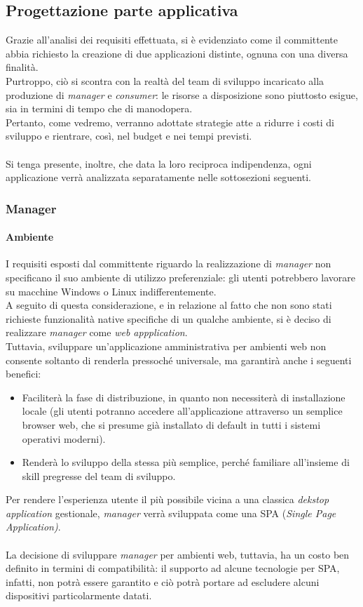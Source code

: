 \documentclass[12pt]{article}
\begin{document}
\subsection{Progettazione parte applicativa}
Grazie all'analisi dei requisiti effettuata, si è evidenziato come il committente abbia richiesto la creazione di due applicazioni distinte, ognuna con una diversa finalità.\\
Purtroppo, ciò si scontra con la realtà del team di sviluppo incaricato alla produzione di \textit{manager} e \textit{consumer}: le risorse a disposizione sono piuttosto esigue, sia in termini di tempo che di manodopera.\\
Pertanto, come vedremo, verranno adottate strategie atte a ridurre i costi di sviluppo e rientrare, così, nel budget e nei tempi previsti.\\\\
Si tenga presente, inoltre, che data la loro reciproca indipendenza, ogni applicazione verrà analizzata separatamente nelle sottosezioni seguenti.
\subsubsection{Manager}
\paragraph{Ambiente}
I requisiti esposti dal committente riguardo la realizzazione di \textit{manager} non specificano il suo ambiente di utilizzo preferenziale: gli utenti potrebbero lavorare su macchine Windows o Linux indifferentemente.\\
A seguito di questa considerazione, e in relazione al fatto che non sono stati richieste funzionalità native specifiche di un qualche ambiente, si è deciso di realizzare \textit{manager} come \textit{web appplication}.\\
Tuttavia, sviluppare un'applicazione amministrativa per ambienti web  non consente soltanto di renderla pressoché universale, ma garantirà anche i seguenti benefici:
\begin{itemize}
\item Faciliterà la fase di distribuzione, in quanto non necessiterà di installazione locale (gli utenti potranno accedere all'applicazione attraverso un semplice browser web, che si presume già installato di default in tutti i sistemi operativi moderni).
 \item Renderà lo sviluppo della stessa più semplice, perché familiare all'insieme di skill pregresse del team di sviluppo.
\end{itemize}
Per rendere l'esperienza utente il più possibile vicina a una classica \textit{dekstop application} gestionale, \textit{manager} verrà sviluppata come una SPA (\textit{Single Page Application)}.\\\\
La decisione di sviluppare \textit{manager} per ambienti web, tuttavia, ha un costo ben definito in termini di compatibilità: il supporto ad alcune tecnologie per SPA, infatti, non potrà essere garantito  e ciò potrà portare ad escludere alcuni dispositivi particolarmente datati.
\end{document}
